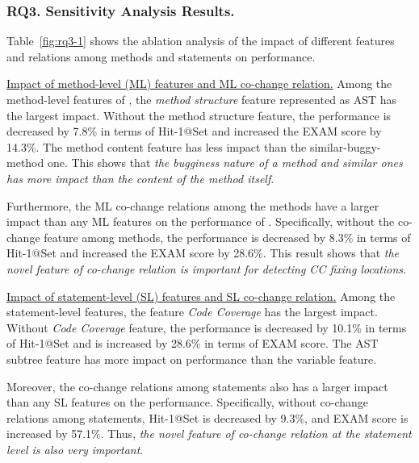 \subsubsection{\bf RQ3. Sensitivity Analysis Results.}\label{sensi}

Table~\ref{fig:rq3-1} shows the ablation analysis of the
impact of different features and relations among methods and statements on performance. 

\underline{Impact of method-level (ML) features and ML co-change relation.}
Among the method-level features of {\tool}, the {\it method structure}
feature represented as AST has the largest impact. Without the method
structure feature, the performance is decreased by 7.8\% in terms of
Hit-1@Set and increased the EXAM score by 14.3\%. The method content
feature has less impact than the similar-buggy-method one. This
shows that {\em the bugginess nature of a method and similar ones has
more impact than the content of the method itself}.


Furthermore, the ML co-change relations among the methods have a larger impact than any ML features on the performance of {\tool}. Specifically, without the co-change feature among methods, the performance is decreased by 8.3\% in terms of Hit-1@Set and increased the EXAM score by 28.6\%. This result shows that {\em the novel feature of co-change relation is important for detecting CC fixing locations}. 


\underline{Impact of statement-level (SL) features and SL co-change relation.}
Among the statement-level features, the feature {\it Code Coverage}
has the largest impact. Without {\it Code Coverage} feature, the
performance is decreased by 10.1\% in terms of Hit-1@Set and is
increased by 28.6\% in terms of EXAM score. The AST subtree feature
has more impact on performance than the variable feature.

Moreover, the co-change relations among statements also has a larger impact than any SL features on the performance. Specifically, without co-change relations among statements, Hit-1@Set is decreased by 9.3\%, and EXAM score is increased by 57.1\%. Thus, {\em the novel feature of co-change
relation at the statement level is also very important}.



